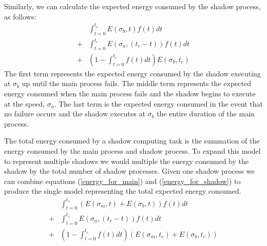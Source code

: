 Similarly, we can calculate the expected energy consumed by the shadow
process, as follows:
\begin{equation}
\label{energy_for_shadow}
\begin{split}
&  \int_{t=0}^{t_c}E(\sigma_b,t)f(t)dt \\
+& \int_{t=0}^{t_c}E(\sigma_a,(t_r-t))f(t)dt \\
+& (1-\int_{t=0}^{t_c}f(t)dt)E(\sigma_b,t_c)
\end{split}
\end{equation}
The first term represents the expected energy consumed by the shadow
executing at $\sigma_b$ up until the main process fails. The middle
term represents the expected energy consumed when the main process
fails and the shadow begins to execute at the speed, $\sigma_a$. The
last term is the expected energy consumed in the event that no failure
occurs and the shadow executes at $\sigma_b$ the entire duration of
the main process.

The total energy consumed by a shadow computing task is the summation
of the energy consumed by the main process and shadow process. To
expand this model to represent multiple shadows we would multiple the
energy consumed by the shadow by the total number of shadow
processes. Given one shadow process we can combine equations
(\ref{energy_for_main}) and (\ref{energy_for_shadow}) to produce the
single model representing the total expected energy consumed.
\begin{equation}
\label{energy_model}
\begin{split}
 & \int_{t=0}^{t_c}(E(\sigma_m,t)+E(\sigma_b,t))f(t)dt \\
+& \int_{t=0}^{t_c}E(\sigma_a,(t_r-t))f(t)dt \\
+& (1-\int_{t=0}^{t_c}f(t)dt)(E(\sigma_m,t_c )+E(\sigma_b,t_c ))
\end{split}
\end{equation}

